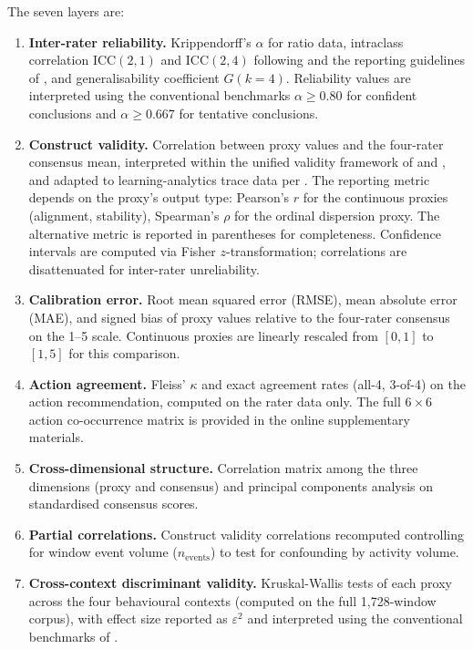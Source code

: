 \documentclass[preprint,12pt,authoryear]{elsarticle}
\begin{document}
The seven layers are:
\begin{enumerate}
\item \textbf{Inter-rater reliability.} Krippendorff's $\alpha$ for ratio data, intraclass correlation ICC$(2,1)$ and ICC$(2,4)$ following \citet{shrout1979} and the reporting guidelines of \citet{koo2016}, and generalisability coefficient $G(k=4)$. Reliability values are interpreted using the conventional benchmarks $\alpha \geq 0.80$ for confident conclusions and $\alpha \geq 0.667$ for tentative conclusions.
\item \textbf{Construct validity.} Correlation between proxy values and the four-rater consensus mean, interpreted within the unified validity framework of \citet{messick1995} and \citet{kane2013}, and adapted to learning-analytics trace data per \citet{winne2020}. The reporting metric depends on the proxy's output type: Pearson's $r$ for the continuous proxies (alignment, stability), Spearman's $\rho$ for the ordinal dispersion proxy. The alternative metric is reported in parentheses for completeness. Confidence intervals are computed via Fisher $z$-transformation; correlations are disattenuated for inter-rater unreliability.
\item \textbf{Calibration error.} Root mean squared error (RMSE), mean absolute error (MAE), and signed bias of proxy values relative to the four-rater consensus on the 1--5 scale. Continuous proxies are linearly rescaled from $[0,1]$ to $[1,5]$ for this comparison.
\item \textbf{Action agreement.} Fleiss' $\kappa$ and exact agreement rates (all-4, 3-of-4) on the action recommendation, computed on the rater data only. The full $6 \times 6$ action co-occurrence matrix is provided in the online supplementary materials.
\item \textbf{Cross-dimensional structure.} Correlation matrix among the three dimensions (proxy and consensus) and principal components analysis \citep{jolliffe2016} on standardised consensus scores.
\item \textbf{Partial correlations.} Construct validity correlations recomputed controlling for window event volume ($n_{\mathrm{events}}$) to test for confounding by activity volume.
\item \textbf{Cross-context discriminant validity.} Kruskal-Wallis tests of each proxy across the four behavioural contexts (computed on the full 1{,}728-window corpus), with effect size reported as $\varepsilon^2$ and interpreted using the conventional benchmarks of \citet{cohen1988}.
\end{enumerate}
\end{document}
